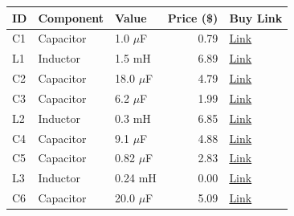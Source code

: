 \begin{table}[H]
    \centering
    \renewcommand{\arraystretch}{1.5}
    \begin{tabular}{@{}lllrl@{}}
        \toprule
        \textbf{ID} & \textbf{Component} & \textbf{Value} & \textbf{Price (\$)} & \textbf{Buy Link} \\
        \midrule
        C1 & Capacitor & 1.0 $\mu$F & 0.79 & \href{https://www.parts-express.com/Dayton-Audio-PMPC-1.0-1.0uF-250V-Precision-Audio-Capacitor-027-210}{Link} \\
        L1 & Inductor & 1.5 mH & 6.89 & \href{https://www.parts-express.com/Jantzen-1060-1.5mH-20-AWG-Air-Core-Inductor-255-052}{Link} \\
        C2 & Capacitor & 18.0 $\mu$F & 4.79 & \href{https://www.parts-express.com/Dayton-Audio-DMPC-18-18uF-250V-Polypropylene-Capacitor-027-434}{Link} \\
        C3 & Capacitor & 6.2 $\mu$F & 1.99 & \href{https://www.parts-express.com/Dayton-Audio-PMPC-6.2-6.2uF-250V-Precision-Audio-Capacitor-027-236}{Link} \\
        L2 & Inductor & 0.3 mH & 6.85 & \href{https://www.parts-express.com/Jantzen-1832-0.30mH-20-AWG-Air-Core-Inductor-255-028}{Link} \\
        C4 & Capacitor & 9.1 $\mu$F & 4.88 & \href{https://www.parts-express.com/Jantzen-0263-9.1uF-400V-Crosscap-Capacitor-027-931}{Link} \\
        C5 & Capacitor & 0.82 $\mu$F & 2.83 & \href{https://www.parts-express.com/Audyn-Cap-Q4-0.82uF-400V-MKP-Foil-Capacitor-027-107}{Link} \\
        L3 & Inductor & 0.24 mH & 0.00 & \href{https://www.parts-express.com/Dayton-Audio-LW14-24-0.24mH-14-AWG-Perfect-Layer-Inductor-257-304}{Link} \\
        C6 & Capacitor & 20.0 $\mu$F & 5.09 & \href{https://www.parts-express.com/Solen-20uF-400V-Polypropylene-Capacitor-027-582}{Link} \\
        \bottomrule
    \end{tabular}
\end{table}
